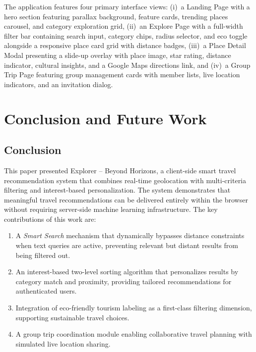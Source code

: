 \documentclass[conference]{IEEEtran}
\begin{document}
The application features four primary interface views: (i)~a Landing Page with a hero section featuring parallax background, feature cards, trending places carousel, and category exploration grid, (ii)~an Explore Page with a full-width filter bar containing search input, category chips, radius selector, and eco toggle alongside a responsive place card grid with distance badges, (iii)~a Place Detail Modal presenting a slide-up overlay with place image, star rating, distance indicator, cultural insights, and a Google Maps directions link, and (iv)~a Group Trip Page featuring group management cards with member lists, live location indicators, and an invitation dialog.

\section{Conclusion and Future Work}

\subsection{Conclusion}

This paper presented Explorer -- Beyond Horizons, a client-side smart travel recommendation system that combines real-time geolocation with multi-criteria filtering and interest-based personalization. The system demonstrates that meaningful travel recommendations can be delivered entirely within the browser without requiring server-side machine learning infrastructure. The key contributions of this work are:

\begin{enumerate}
    \item A \textit{Smart Search} mechanism that dynamically bypasses distance constraints when text queries are active, preventing relevant but distant results from being filtered out.
    \item An interest-based two-level sorting algorithm that personalizes results by category match and proximity, providing tailored recommendations for authenticated users.
    \item Integration of eco-friendly tourism labeling as a first-class filtering dimension, supporting sustainable travel choices.
    \item A group trip coordination module enabling collaborative travel planning with simulated live location sharing.
\end{enumerate}
\end{document}
